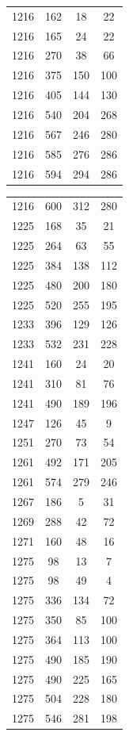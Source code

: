 \documentclass[12pt]{amsproc} %
\theoremstyle{definition}\newtheorem{defn}[thm]{Definition}
\theoremstyle{definition}\newtheorem{rem}[thm]{Remark}
\theoremstyle{definition}\newtheorem{ex}[thm]{Example}
\begin{document}
\begin{table}[ht]
\begin{minipage}{0.25\textwidth}
\begin{tabular}{c|c|c|c}
      1216&162&18&22\\ 
      1216&165&24&22\\ 
      1216&270&38&66\\ 
      1216&375&150&100\\ 
      1216&405&144&130\\ 
      1216&540&204&268\\ 
      1216&567&246&280\\ 
      1216&585&276&286\\ 
      1216&594&294&286\\ 
            \end{tabular}
    \end{minipage}
    \hfill
    \begin{minipage}{0.25\textwidth}
        \centering
            \begin{tabular}{c|c|c|c}
      1216&600&312&280\\
      1225&168&35&21\\ 
      1225&264&63&55\\ 
      1225&384&138&112\\ 
      1225&480&200&180\\ 
      1225&520&255&195\\ 
      1233&396&129&126\\ 
      1233&532&231&228\\ 
      1241&160&24&20\\ 
      1241&310&81&76\\ 
      1241&490&189&196\\ 
      1247&126&45&9\\ 
      1251&270&73&54\\ 
      1261&492&171&205\\ 
      1261&574&279&246\\
      1267&186&5&31\\ 
      1269&288&42&72\\ 
      1271&160&48&16\\ 
      1275&98&13&7\\ 
      1275&98&49&4\\ 
      1275&336&134&72\\ 
      1275&350&85&100\\ 
      1275&364&113&100\\ 
      1275&490&185&190\\ 
      1275&490&225&165\\ 
      1275&504&228&180\\ 
      1275&546&281&198\\ 

\end{tabular}
\end{minipage}
\end{table}
\end{document}
